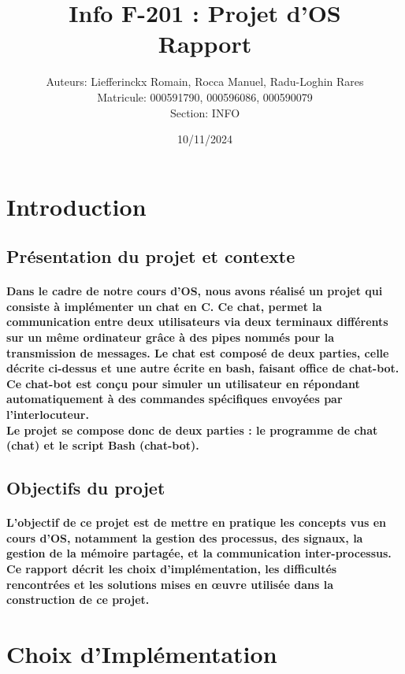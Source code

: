 \documentclass[utf8]{article}
\title{Info F-201 : Projet d’OS \\Rapport}
\author{Auteurs: Liefferinckx Romain, Rocca Manuel, Radu-Loghin Rares\\ Matricule: 000591790, 000596086, 000590079 \\ Section: INFO}
\date{10/11/2024}
\begin{document}
\maketitle
\tableofcontents

\newpage


\section{Introduction}
\subsection{Présentation du projet et contexte}
\paragraph{Dans le cadre de notre cours d'OS, nous avons réalisé un projet qui consiste à implémenter un chat en C.
Ce chat, permet la communication entre deux utilisateurs via deux terminaux différents sur un même ordinateur grâce à des 
pipes nommés pour la transmission de messages. Le chat est composé de deux parties, celle décrite ci-dessus et une autre écrite en bash,
faisant office de chat-bot. Ce chat-bot est conçu pour simuler un utilisateur en répondant automatiquement à des commandes spécifiques 
envoyées par l’interlocuteur.\\
Le projet se compose donc de deux parties : le programme de chat (chat) et le script Bash (chat-bot).}

\subsection{Objectifs du projet}
\paragraph{L'objectif de ce projet est de mettre en pratique les concepts vus en cours d'OS, notamment la gestion des processus,
des signaux, la gestion de la mémoire partagée, et la communication inter-processus. 
Ce rapport décrit les choix d'implémentation, les difficultés rencontrées et les solutions mises en œuvre utilisée dans la 
construction de ce projet.}


\section{Choix d’Implémentation}
\end{document}
